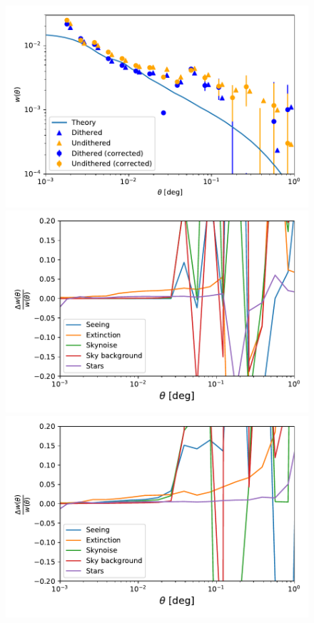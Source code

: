 \documentclass[twocolumn]{aastex62}
\begin{document}
\begin{figure}
\centering
\includegraphics[width=0.9\columnwidth]{w_comp_corr25p3.pdf}
\includegraphics[width=0.9\columnwidth]{sys_dithered_25p3_v2.pdf}
\includegraphics[width=0.9\columnwidth]{sys_undithered_25p3_v2.pdf}

\end{figure}
\end{document}
